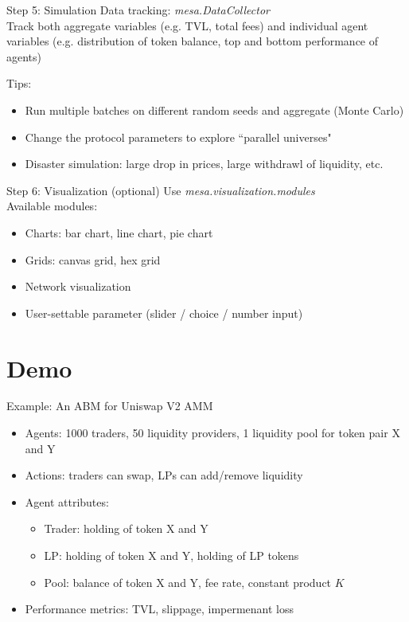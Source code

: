 \documentclass{beamer}
\begin{document}
\begin{frame}{Step 5: Simulation}
    Data tracking: \textit{mesa.DataCollector}\\
    Track both aggregate variables (e.g. TVL, total fees) and individual agent variables (e.g. distribution of token balance, top and bottom performance of agents)

    \bigskip
    
    Tips:
    \begin{itemize}
        \item Run multiple batches on different random seeds and aggregate (Monte Carlo)
        \item Change the protocol parameters to explore ``parallel universes"
        \item Disaster simulation: large drop in prices, large withdrawl of liquidity, etc.
    \end{itemize}
\end{frame}


\begin{frame}{Step 6: Visualization (optional)}
    Use \textit{mesa.visualization.modules}\\
    Available modules:
    \begin{itemize}
        \item Charts: bar chart, line chart, pie chart
        \item Grids: canvas grid, hex grid
        \item Network visualization
        \item User-settable parameter (slider / choice / number input)
    \end{itemize}


\end{frame}


\section{Demo}

\begin{frame}{Example: An ABM for Uniswap V2 AMM}
    \begin{itemize}
        \item Agents: 1000 traders, 50 liquidity providers, 1 liquidity pool for token pair X and Y
        \item Actions: traders can swap, LPs can add/remove liquidity
        \item Agent attributes:
              \begin{itemize}
                  \item Trader: holding of token X and Y
                  \item LP: holding of token X and Y, holding of LP tokens
                  \item Pool: balance of token X and Y, fee rate, constant product $K$
              \end{itemize}
        \item Performance metrics: TVL, slippage, impermenant loss
    \end{itemize}
\end{frame}
\end{document}
